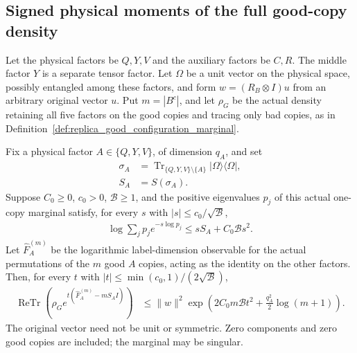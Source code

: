 \subsection{Signed physical moments of the full good-copy density}
\label{sec:replica_good_configuration_label_moment}

Let the physical factors be $Q,Y,V$ and the auxiliary factors be $C,R$.
The middle factor $Y$ is a separate tensor factor. Let $\Omega$ be a unit
vector on the physical space, possibly entangled among these factors, and form $w=(R_B\otimes I)u$ from an arbitrary
original vector $u$. Put $m=|B^c|$, and let $\rho_G$ be the actual density
retaining all five factors on the good copies and tracing only bad copies,
as in Definition~\ref{def:replica_good_configuration_marginal}.

\begin{theorem}
\label{thm:replica_good_configuration_label_moment}
\leanok
{}
Fix a physical factor $A\in\{Q,Y,V\}$, of dimension $q_A$, and set
\begin{align}
 \sigma_A&=\operatorname{Tr}_{\{Q,Y,V\}\setminus\{A\}}
               |\Omega\rangle\langle\Omega|,\\
 S_A&=S(\sigma_A).
\end{align}
Suppose $C_0\geq0$, $c_0>0$, $\mathcal B\geq1$, and the positive
eigenvalues $p_j$ of this actual one-copy marginal satisfy, for every $s$
with $|s|\leq c_0/\sqrt{\mathcal B}$,
\begin{align}
 \log\sum_jp_j e^{-s\log p_j}
 \leq sS_A+C_0\mathcal B s^2.
\end{align}
Let $\widehat F_A^{(m)}$ be the logarithmic label-dimension observable for
the actual permutations of the $m$ good $A$ copies, acting as the identity
on the other factors. Then, for every $t$ with
$|t|\leq\min(c_0,1)/(2\sqrt{\mathcal B})$,
\begin{align}
 \operatorname{ReTr}\!\left(\rho_G
 e^{t(\widehat F_A^{(m)}-mS_AI)}\right)
 &\leq\|w\|^2\exp\!\left(
       2C_0m\mathcal B t^2+\frac{q_A^2}{2}\log(m+1)\right).
 \label{eq:replica_good_configuration_label_moment}
\end{align}
The original vector need not be unit or symmetric. Zero components and
zero good copies are included; the marginal may be singular.
\end{theorem}

